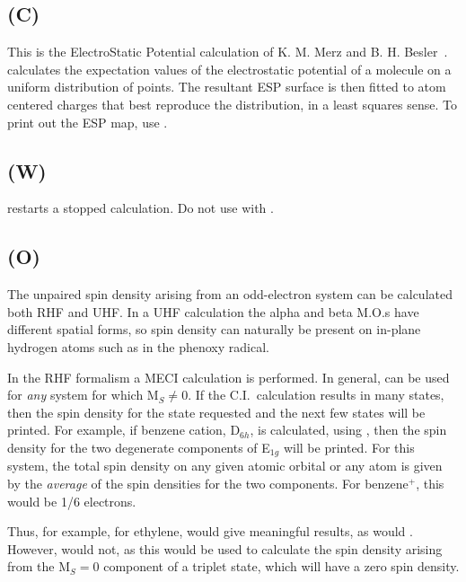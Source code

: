 \subsection*{ (C)}
This is the ElectroStatic Potential calculation  of  K. M. Merz  and B. H.
Besler~\cite{esp}.  calculates the expectation values of the
electrostatic potential of a  molecule  on  a  uniform  distribution  of
points.   The  resultant  ESP  surface is then
fitted to atom centered charges that best reproduce the distribution, in a
least squares sense. To print out the ESP map, use .



\subsection*{ (W)}
 restarts a stopped  calculation.  Do not use with .

\subsection*{ (O)}
The unpaired spin density arising from an odd-electron system can be
calculated  both  RHF  and  UHF.  In a UHF calculation the alpha and beta
M.O.s have  different  spatial  forms,  so   spin  density  can
naturally  be  present  on in-plane hydrogen atoms such as in the phenoxy
radical.


In the RHF formalism  a  MECI  calculation  is  performed.
In general,  can be used for {\em any} system for which M$_S \neq 0$.
If the C.I.\ calculation
results in many states, then the spin density for the state requested
and the next few states will be printed.  For example, if benzene cation, D$_{6h}$,
is calculated, using , then the spin density for
the two degenerate components of E$_{1g}$ will be printed.  For this system, the
total spin density on any given atomic orbital or any atom is given
by the {\em average} of the spin densities for the two components.  For
benzene$^+$, this would be 1/6 electrons.

Thus, for example, for ethylene,  would
give meaningful results, as would
. However,  would not, as this
would be used to calculate the spin density arising from the M$_S = 0$
component of a triplet
state, which will have a zero spin density.


